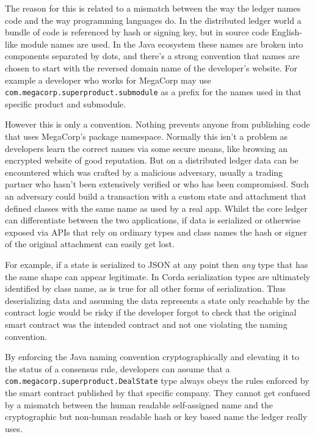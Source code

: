 \documentclass{article}
\begin{document}
The reason for this is related to a mismatch between the way the ledger names code and the way programming
languages do. In the distributed ledger world a bundle of code is referenced by hash or signing key, but in source
code English-like module names are used. In the Java ecosystem these names are broken into components separated by
dots, and there's a strong convention that names are chosen to start with the reversed domain name of the
developer's website. For example a developer who works for MegaCorp may use
\texttt{com.megacorp.superproduct.submodule} as a prefix for the names used in that specific product and submodule.

However this is only a convention. Nothing prevents anyone from publishing code that uses MegaCorp's package
namespace. Normally this isn't a problem as developers learn the correct names via some secure means, like browsing
an encrypted website of good reputation. But on a distributed ledger data can be encountered which was crafted by a
malicious adversary, usually a trading partner who hasn't been extensively verified or who has been compromised.
Such an adversary could build a transaction with a custom state and attachment that defined classes with the same
name as used by a real app. Whilst the core ledger can differentiate between the two applications, if data is
serialized or otherwise exposed via APIs that rely on ordinary types and class names the hash or signer of the
original attachment can easily get lost.

For example, if a state is serialized to JSON at any point then \emph{any} type that has the same shape can appear
legitimate. In Corda serialization types are ultimately identified by class name, as is true for all other forms of
serialization. Thus deserializing data and assuming the data represents a state only reachable by the contract
logic would be risky if the developer forgot to check that the original smart contract was the intended contract
and not one violating the naming convention.

By enforcing the Java naming convention cryptographically and elevating it to the status of a consensus rule,
developers can assume that a \texttt{com.megacorp.superproduct.DealState} type always obeys the rules enforced by
the smart contract published by that specific company. They cannot get confused by a mismatch between the human
readable self-assigned name and the cryptographic but non-human readable hash or key based name the ledger really
uses.

\end{document}
